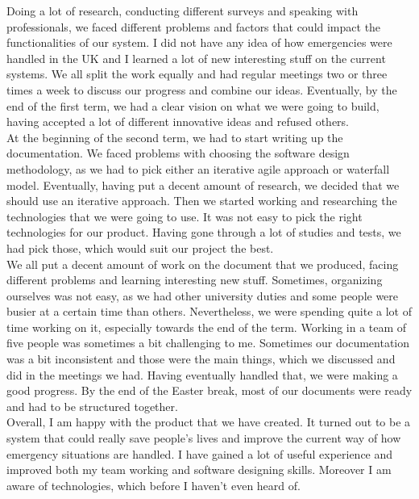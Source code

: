 \documentclass[]{article}
\begin{document}
Doing a lot of research, conducting different surveys and speaking with professionals, we faced different problems and factors that could impact the functionalities of our system. I did not have any idea of how emergencies were handled in the UK and I learned a lot of new interesting stuff on the current systems. We all split the work equally and had regular meetings two or three times a week to discuss our progress and combine our ideas. Eventually, by the end of the first term, we had a clear vision on what we were going to build, having accepted a lot of different innovative ideas and refused others.\\

At the beginning of the second term, we had to start writing up the documentation. We faced problems with choosing the software design methodology, as we had to pick either an iterative agile approach or waterfall model. Eventually, having put a decent amount of research, we decided that we should use an iterative approach. Then we started working and researching the technologies that we were going to use. It was not easy to pick the right technologies for our product. Having gone through a lot of studies and tests, we had pick those, which would suit our project the best.\\

We all put a decent amount of work on the document that we produced, facing different problems and learning interesting new stuff. Sometimes, organizing ourselves was not easy, as we had other university duties and some people were busier at a certain time than others. Nevertheless, we were spending quite a lot of time working on it, especially towards the end of the term. Working in a team of five people was sometimes a bit challenging to me. Sometimes our documentation was a bit inconsistent and those were the main things, which we discussed and did in the meetings we had. Having eventually handled that, we were making a good progress. By the end of the Easter break, most of our documents were ready and had to be structured together.\\

Overall, I am happy with the product that we have created. It turned out to be a system that could really save people’s lives and improve the current way of how emergency situations are handled. I have gained a lot of useful experience and improved both my team working and software designing skills. Moreover I am aware of technologies, which before I haven’t even heard of.
\end{document}
